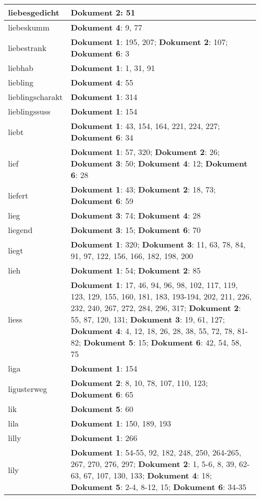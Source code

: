 \documentclass[a5paper]{article}
\begin{document}
\begin{longtable}[l]{|l|p{3in}|}
liebesgedicht & \textbf{Dokument 2}: 51 \\
\hline
liebeskumm & \textbf{Dokument 4}: 9, 77 \\
\hline
liebestrank & \textbf{Dokument 1}: 195, 207; \textbf{Dokument 2}: 107; \textbf{Dokument 6}: 3 \\
\hline
liebhab & \textbf{Dokument 1}: 1, 31, 91 \\
\hline
liebling & \textbf{Dokument 4}: 55 \\
\hline
lieblingscharakt & \textbf{Dokument 1}: 314 \\
\hline
lieblingssuss & \textbf{Dokument 1}: 154 \\
\hline
liebt & \textbf{Dokument 1}: 43, 154, 164, 221, 224, 227; \textbf{Dokument 6}: 34 \\
\hline
lief & \textbf{Dokument 1}: 57, 320; \textbf{Dokument 2}: 26; \textbf{Dokument 3}: 50; \textbf{Dokument 4}: 12; \textbf{Dokument 6}: 28 \\
\hline
liefert & \textbf{Dokument 1}: 43; \textbf{Dokument 2}: 18, 73; \textbf{Dokument 6}: 59 \\
\hline
lieg & \textbf{Dokument 3}: 74; \textbf{Dokument 4}: 28 \\
\hline
liegend & \textbf{Dokument 3}: 15; \textbf{Dokument 6}: 70 \\
\hline
liegt & \textbf{Dokument 1}: 320; \textbf{Dokument 3}: 11, 63, 78, 84, 91, 97, 122, 156, 166, 182, 198, 200 \\
\hline
lieh & \textbf{Dokument 1}: 54; \textbf{Dokument 2}: 85 \\
\hline
liess & \textbf{Dokument 1}: 17, 46, 94, 96, 98, 102, 117, 119, 123, 129, 155, 160, 181, 183, 193-194, 202, 211, 226, 232, 240, 267, 272, 284, 296, 317; \textbf{Dokument 2}: 55, 87, 120, 131; \textbf{Dokument 3}: 19, 61, 127; \textbf{Dokument 4}: 4, 12, 18, 26, 28, 38, 55, 72, 78, 81-82; \textbf{Dokument 5}: 15; \textbf{Dokument 6}: 42, 54, 58, 75 \\
\hline
liga & \textbf{Dokument 1}: 154 \\
\hline
ligusterweg & \textbf{Dokument 2}: 8, 10, 78, 107, 110, 123; \textbf{Dokument 6}: 65 \\
\hline
lik & \textbf{Dokument 5}: 60 \\
\hline
lila & \textbf{Dokument 1}: 150, 189, 193 \\
\hline
lilly & \textbf{Dokument 1}: 266 \\
\hline
lily & \textbf{Dokument 1}: 54-55, 92, 182, 248, 250, 264-265, 267, 270, 276, 297; \textbf{Dokument 2}: 1, 5-6, 8, 39, 62-63, 67, 107, 130, 133; \textbf{Dokument 4}: 18; \textbf{Dokument 5}: 2-4, 8-12, 15; \textbf{Dokument 6}: 34-35 \\

\end{longtable}
\end{document}
